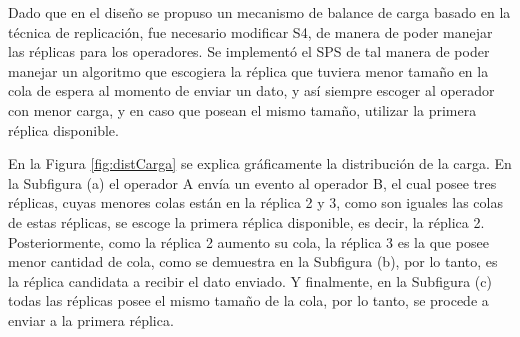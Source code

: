 Dado que en el diseño se propuso un mecanismo de balance de carga basado en la técnica de replicación, fue necesario modificar S4, de manera de poder manejar las réplicas para los operadores. Se implementó el SPS de tal manera de poder manejar un algoritmo que escogiera la réplica que tuviera menor tamaño en la cola de espera al momento de enviar un dato, y así siempre escoger al operador con menor carga, y en caso que posean el mismo tamaño, utilizar la primera réplica disponible.

En la Figura \ref{fig:distCarga} se explica gráficamente la distribución de la carga. En la Subfigura (a) el operador A envía un evento al operador B, el cual posee tres réplicas, cuyas menores colas están en la réplica 2 y 3, como son iguales las colas de estas réplicas, se escoge la primera réplica disponible, es decir, la réplica 2. Posteriormente, como la réplica 2 aumento su cola, la réplica 3 es la que posee menor cantidad de cola, como se demuestra en la Subfigura (b), por lo tanto, es la réplica candidata a recibir el dato enviado. Y finalmente, en la Subfigura (c) todas las réplicas posee el mismo tamaño de la cola, por lo tanto, se procede a enviar a la primera réplica.

